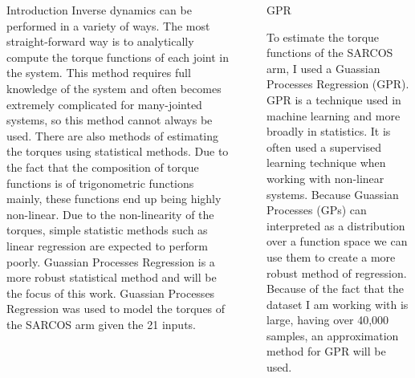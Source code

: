 \documentclass[final]{beamer}
\newlength{\sepwid}
\newlength{\onecolwid}
\newlength{\twocolwid}
\begin{document}
\begin{frame}[t]
\begin{columns}[t]
\begin{column}{\onecolwid}
\begin{block}{Introduction}
    Inverse dynamics can be performed in a variety of ways. The most straight-forward way is to
    analytically compute the torque functions of each joint in the system. This method requires
    full knowledge of the system and often becomes extremely complicated for many-jointed systems,
    so this method cannot always be used. There are also methods of estimating the torques using
    statistical methods. Due to the fact that the composition of torque functions is of
    trigonometric functions mainly, these functions end up being highly non-linear. Due to the
    non-linearity of the torques, simple statistic methods such as linear regression are expected
    to perform poorly. Guassian Processes Regression is a more robust statistical method and will
    be the focus of this work. Guassian Processes Regression was used to model the torques of the
    SARCOS arm given the 21 inputs.

\end{block}


\end{column} %

\begin{column}{\sepwid}\end{column} %


\begin{column}{\twocolwid} %
\begin{columns}[t,totalwidth=\twocolwid] %

\begin{column}{\onecolwid}\vspace{-.6in} %


\begin{block}{GPR}

    To estimate the torque functions of the SARCOS arm, I used a Guassian Processes Regression
    (GPR). GPR is a technique used in machine learning and more broadly in statistics. It is often
    used a supervised learning technique when working with non-linear systems. Because
    Guassian Processes (GPs) can interpreted as a distribution over a function space
    we can use them to create a more robust method of regression. Because of
    the fact that the dataset I am working with is large, having over 40,000 samples, an
    approximation method for GPR will be used.


\end{block}
\end{column}
\end{columns}
\end{column}
\end{columns}
\end{frame}
\end{document}
